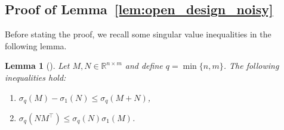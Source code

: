 \documentclass[journal,twoside,web]{ieeecolor}
\newtheorem{lemma}[theorem]{Lemma}
\begin{document}
\subsection{Proof of Lemma~\ref{lem:open_design_noisy}}

Before stating the proof, we recall some singular value inequalities in the following lemma.

\begin{lemma}[{\cite[Thm. 3.3.16]{horn1994topics}}]
\label{lem:horn}
Let $M,N\in\mathbb{R}^{n\times m}$ and define $q=\min\{n,m\}$. The following inequalities hold:
\begin{enumerate}[label=(\alph*),ref=\ref{lem:horn}(\alph*)]
    \item\label{lem:horn(c)} $\sigma_{q}(M)-\sigma_1(N)\leq\sigma_q(M+N)$,
    \item\label{lem:horn(d)} $\sigma_q(NM^\top)\leq \sigma_q(N)\sigma_1(M)$.
\end{enumerate}
\end{lemma}
\end{document}
